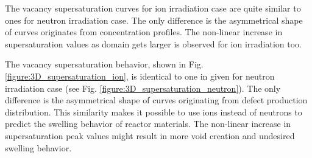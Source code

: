 \documentclass[a4paper]{article}
\begin{document}
    The vacancy supersaturation curves for ion irradiation case are quite similar to ones for neutron irradiation case. The only difference is the asymmetrical shape of curves originates from concentration profiles. The non-linear increase in supersaturation values as domain gets larger is observed for ion irradiation too.

    The vacancy supersaturation behavior, shown in Fig. \ref{figure:3D_supersaturation_ion}, is identical to one in given for neutron irradiation case (see Fig. \ref{figure:3D_supersaturation_neutron}). The only difference is the asymmetrical shape of curves originating from defect production distribution. This similarity makes it possible to use ions instead of neutrons to predict the swelling behavior of reactor materials. The non-linear increase in supersaturation peak values might result in more void creation and undesired swelling behavior.
\end{document}
